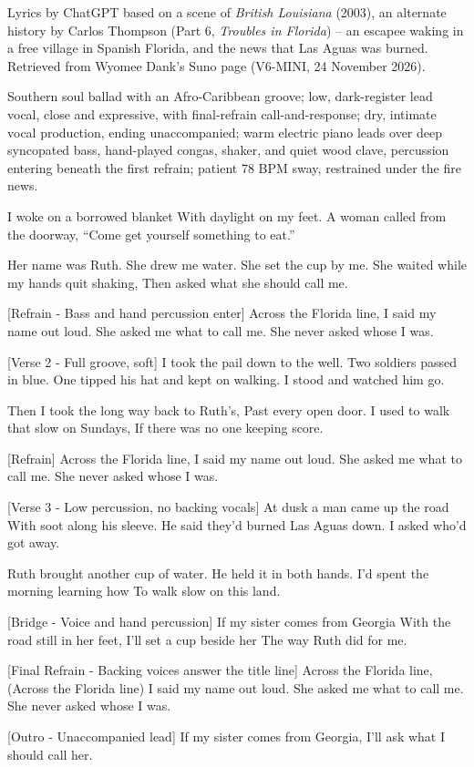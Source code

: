 \begin{notes}
Lyrics by ChatGPT based on a scene of \emph{British Louisiana} (2003), an alternate history by Carlos Thompson (Part 6, \emph{Troubles in Florida}) -- an escapee waking in a free village in Spanish Florida, and the news that Las Aguas was burned. Retrieved from Wyomee Dank's Suno page (V6-MINI, 24 November 2026).
\end{notes}
\begin{style}
Southern soul ballad with an Afro-Caribbean groove; low, dark-register lead vocal, close and expressive, with final-refrain call-and-response; dry, intimate vocal production, ending unaccompanied; warm electric piano leads over deep syncopated bass, hand-played congas, shaker, and quiet wood clave, percussion entering beneath the first refrain; patient 78 BPM sway, restrained under the fire news.
\end{style}
\begin{lyrics}
I woke on a borrowed blanket
With daylight on my feet.
A woman called from the doorway,
“Come get yourself something to eat.”

Her name was Ruth. She drew me water.
She set the cup by me.
She waited while my hands quit shaking,
Then asked what she should call me.

[Refrain - Bass and hand percussion enter]
Across the Florida line,
I said my name out loud.
She asked me what to call me.
She never asked whose I was.

[Verse 2 - Full groove, soft]
I took the pail down to the well.
Two soldiers passed in blue.
One tipped his hat and kept on walking.
I stood and watched him go.

Then I took the long way back to Ruth’s,
Past every open door.
I used to walk that slow on Sundays,
If there was no one keeping score.

[Refrain]
Across the Florida line,
I said my name out loud.
She asked me what to call me.
She never asked whose I was.

[Verse 3 - Low percussion, no backing vocals]
At dusk a man came up the road
With soot along his sleeve.
He said they’d burned Las Aguas down.
I asked who’d got away.

Ruth brought another cup of water.
He held it in both hands.
I’d spent the morning learning how
To walk slow on this land.

[Bridge - Voice and hand percussion]
If my sister comes from Georgia
With the road still in her feet,
I’ll set a cup beside her
The way Ruth did for me.

[Final Refrain - Backing voices answer the title line]
Across the Florida line,
(Across the Florida line)
I said my name out loud.
She asked me what to call me.
She never asked whose I was.

[Outro - Unaccompanied lead]
If my sister comes from Georgia,
I’ll ask what I should call her.
\end{lyrics}

